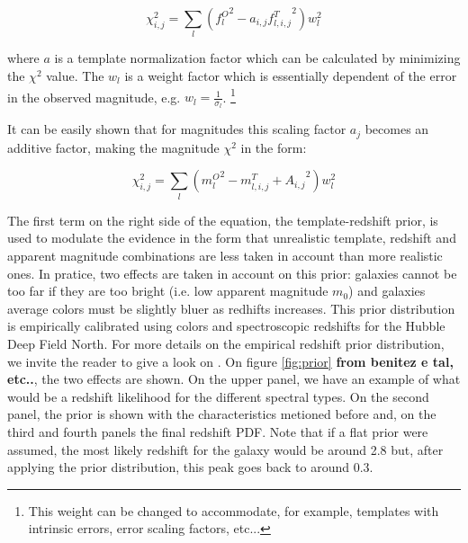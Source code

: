 \documentclass[9pt]{memoir}
\begin{document}
\begin{equation}
\chi^2_{i,j} = \sum_l \left( {f^O_l}^2 - a_{i,j} {f^T_{l,i,j}}^2 \right) w^2_l
\end{equation}

\noindent where $a$ is a template normalization factor which can be calculated by minimizing the $\chi^2$ value. The $w_l$ is a weight factor which is essentially dependent of the error in the observed magnitude, e.g. $w_l = \frac{1}{\sigma_l}$. \footnote{This weight can be changed to accommodate, for example, templates with intrinsic errors, error scaling factors, etc...}

It can be easily shown that for magnitudes this scaling factor $a_j$ becomes an additive factor, making the magnitude $\chi^2$ in the form:

\begin{equation}
\chi^2_{i,j} = \sum_l \left( {m^O_l}^2 - {m^T_{l,i,j} + A_{i,j}}^2 \right) w^2_l
\end{equation}

The first term on the right side of the equation, the template-redshift prior, is used to modulate the evidence in the form that unrealistic template, redshift and apparent magnitude combinations are less taken in account than more realistic ones. In pratice, two effects are taken in account on this prior: galaxies cannot be too far if they are too bright (i.e. low apparent magnitude $m_0$) and galaxies average colors must be slightly bluer as redhifts increases. This prior distribution is empirically calibrated using colors and spectroscopic redshifts for the Hubble Deep Field North. For more details on the empirical redshift prior distribution, we invite the reader to give a look on \cite{Benitez.2000a}. On figure \ref{fig:prior} \textbf{from benitez e tal, etc..}, the two effects are shown. On the upper panel, we have an example of what would be a redshift likelihood for the different spectral types. On the second panel, the prior is shown with the characteristics metioned before and, on the third and fourth panels the final redshift PDF. Note that if a flat prior were assumed, the most likely redshift for the galaxy would be around 2.8 but, after applying the prior distribution, this peak goes back to around 0.3.
\end{document}
